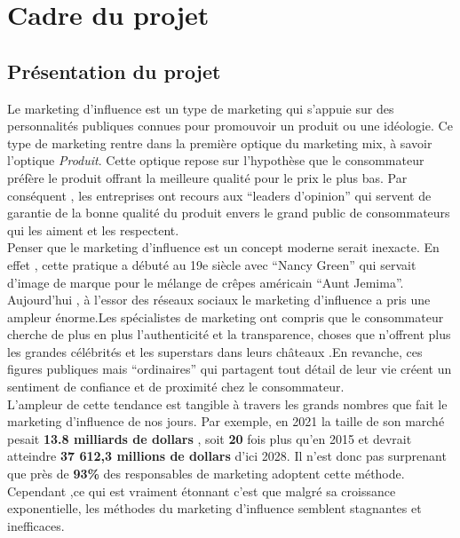 \documentclass[12pt]{extarticle}
\begin{document}
\renewcommand*\contentsname{Table des matières}
\renewcommand{\listfigurename}{Liste des figures}
\renewcommand{\listtablename}{Liste des tableaux}

\tableofcontents
\clearpage
\listoffigures
\clearpage
\listoftables
\clearpage

\section{Cadre du projet}
\subsection{Présentation du projet}
 Le marketing d’influence est un type de marketing qui s’appuie sur des personnalités publiques connues pour promouvoir un produit ou une idéologie. Ce type de marketing rentre dans la  première optique du marketing  mix, à savoir l’optique\textit{ Produit}. Cette optique repose sur l’hypothèse que le consommateur préfère le produit offrant la meilleure qualité pour le prix le plus bas. Par conséquent , les entreprises ont recours aux “leaders d’opinion” qui servent de garantie de la bonne qualité du produit envers le grand public de consommateurs qui les aiment et les respectent. \\
Penser que le marketing d’influence est un concept moderne serait inexacte. En effet , cette pratique  a débuté au 19e siècle avec “Nancy Green” qui servait d’image de marque pour le mélange de crêpes américain “Aunt Jemima”.\\Aujourd’hui , à l’essor des réseaux sociaux le marketing d’influence a pris une ampleur énorme.Les spécialistes de marketing ont compris que le consommateur cherche de plus en plus l’authenticité et la transparence, choses que n’offrent plus  les grandes célébrités et les superstars dans leurs châteaux .En revanche, ces  figures publiques mais  “ordinaires”  qui partagent tout détail de leur vie créent un sentiment de confiance et de proximité chez le consommateur.\\
L’ampleur de cette tendance est tangible à travers les grands nombres que fait le marketing d’influence de nos jours. Par exemple, en 2021 la taille de son marché pesait \textbf{13.8 milliards de dollars} , soit \textbf{20} fois plus qu’en 2015 et devrait atteindre\textbf{ 37 612,3 millions de dollars} d'ici 2028. Il n’est  donc pas surprenant que près de \textbf{93\%} des responsables de marketing adoptent cette méthode.\\
Cependant ,ce  qui est vraiment étonnant c’est que malgré sa croissance exponentielle, les méthodes du marketing d’influence semblent stagnantes et inefficaces. \cite{5,6,7}
\end{document}
